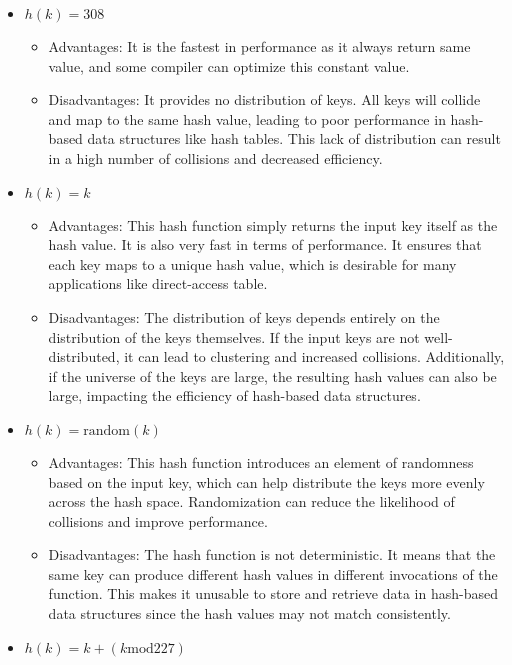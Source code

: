 \documentclass[10pt]{article}
\begin{document}
\begin{itemize}
  \item {
        $h(k) = 308$

        \begin{itemize}
          \item {
                Advantages: It is the fastest in performance as it always return same value, and some compiler can optimize this constant value.
                }
          \item {
                Disadvantages: It provides no distribution of keys. All keys will collide and map to the same hash value, leading to poor performance in hash-based data structures like hash tables. This lack of distribution can result in a high number of collisions and decreased efficiency.
                }
        \end{itemize}
        }
  \item {
        $h(k) = k$

        \begin{itemize}
          \item {
                Advantages: This hash function simply returns the input key itself as the hash value. It is also very fast in terms of performance. It ensures that each key maps to a unique hash value, which is desirable for many applications like direct-access table.
                }
          \item {
                Disadvantages: The distribution of keys depends entirely on the distribution of the keys themselves. If the input keys are not well-distributed, it can lead to clustering and increased collisions. Additionally, if the universe of the keys are large, the resulting hash values can also be large, impacting the efficiency of hash-based data structures.
                }
        \end{itemize}
        }
  \item {
        $h(k) = \text{random}(k)$

        \begin{itemize}
          \item {
                Advantages: This hash function introduces an element of randomness based on the input key, which can help distribute the keys more evenly across the hash space. Randomization can reduce the likelihood of collisions and improve performance.
                }
          \item {
                Disadvantages: The hash function is not deterministic. It means that the same key can produce different hash values in different invocations of the function. This makes it unusable to store and retrieve data in hash-based data structures since the hash values may not match consistently.
                }
        \end{itemize}
        }
  \item {
        $h(k) = k + (k \text{mod} 227)$

}
\end{itemize}
\end{document}
